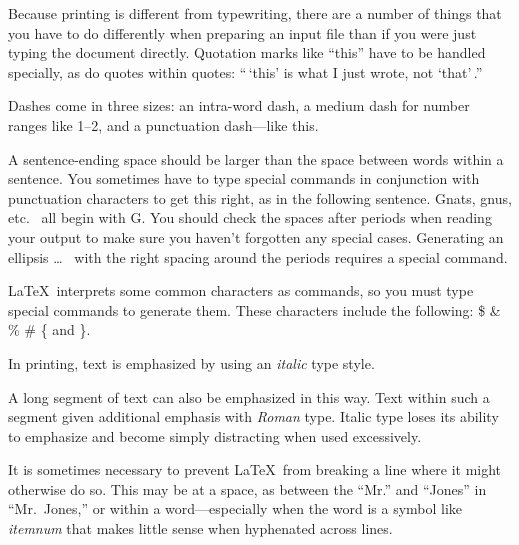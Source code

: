 Because printing is different from typewriting, there are a number of
things that you have to do differently when preparing an input file than
if you were just typing the document directly.
Quotation marks like
       ``this''
have to be handled specially, as do quotes within quotes:
       ``\,`this'                  %
        is what I just
        wrote, not  `that'\,.''

Dashes come in three sizes: an
       intra-word
dash, a medium dash for number ranges like
       1--2,
and a punctuation
       dash---like
this.

A sentence-ending space should be larger than the space between words
within a sentence.  You sometimes have to type special commands in
conjunction with punctuation characters to get this right, as in the
following sentence.
       Gnats, gnus, etc.\    %
       all begin with G\@.   %
You should check the spaces after periods when reading your output to
make sure you haven't forgotten any special cases.
Generating an ellipsis
       \ldots\    %
with the right spacing around the periods
requires a special  command.

\LaTeX\ interprets some common characters as commands, so you must type
special commands to generate them.  These characters include the
following:
       \$ \& \% \# \{ and \}.

In printing, text is emphasized by using an
       {\em italic\/}  %
type style.

\begin{em}
   A long segment of text can also be emphasized in this way.  Text within
   such a segment given additional emphasis
          with\/ {\em Roman}
   type.  Italic type loses its ability to emphasize and become simply
   distracting when used excessively.
\end{em}

It is sometimes necessary to prevent \LaTeX\ from breaking a line where
it might otherwise do so.  This may be at a space, as between the
``Mr.'' and ``Jones'' in
       ``Mr.~Jones,''        %
or within a word---especially when the word is a symbol like
       \mbox{\em itemnum\/}
that makes little sense when hyphenated across
       lines.

